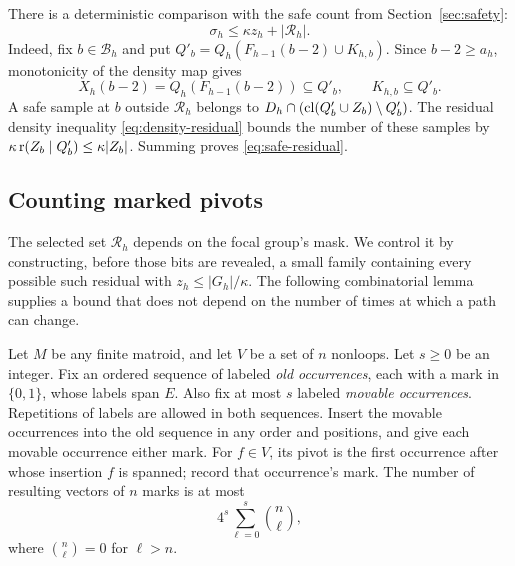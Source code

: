 There is a deterministic comparison with the safe count from
Section~\ref{sec:safety}:
\begin{equation}\label{eq:safe-residual}
 \sigma_h\le\kappa z_h+|\mathcal R_h|.
\end{equation}
Indeed, fix $b\in\mathcal B_h$ and put
$Q'_b=Q_h(F_{h-1}(b-2)\cup K_{h,b})$.
Since $b-2\ge a_h$, monotonicity of the density map gives
\[
 X_h(b-2)=Q_h(F_{h-1}(b-2))\subseteq Q'_b,
 \qquad K_{h,b}\subseteq Q'_b.
\]
A safe sample at $b$ outside $\mathcal R_h$ belongs to
$D_h\cap(\operatorname{cl}(Q'_b\cup Z_b)\setminus Q'_b)$.
The residual density inequality \eqref{eq:density-residual} bounds the
number of these samples by
$\kappa\operatorname{r}(Z_b\mid Q'_b)\le\kappa|Z_b|$.
Summing proves \eqref{eq:safe-residual}.

\subsection{Counting marked pivots}

The selected set $\mathcal R_h$ depends on the focal group's mask.
We control it by constructing, before those bits are revealed, a small
family containing every possible such residual with
$z_h\le |G_h|/\kappa$.
The following combinatorial lemma supplies a bound that does not depend
on the number of times at which a path can change.

\begin{lemma}\label{lem:pivot-patterns}
Let $M$ be any finite matroid, and let $V$ be a set of $n$ nonloops.
Let $s\ge0$ be an integer.  Fix an ordered sequence of labeled
\emph{old occurrences}, each with a
mark in $\{0,1\}$, whose labels span $E$.  Also fix at most $s$ labeled
\emph{movable occurrences}.  Repetitions of labels are allowed in both
sequences.  Insert the movable occurrences into the old sequence in any
order and positions, and give each movable occurrence either mark.
For $f\in V$, its pivot is the first occurrence after whose insertion
$f$ is spanned; record that occurrence's mark.  The number of resulting
vectors of $n$ marks is at most
\begin{equation}\label{eq:pivot-pattern-bound}
 4^s\sum_{\ell=0}^{s}\binom n\ell,
\end{equation}
where $\binom n\ell=0$ for $\ell>n$.
\end{lemma}

